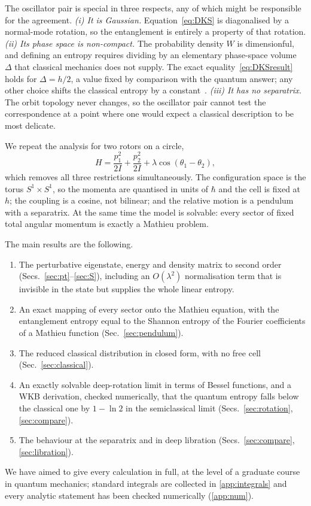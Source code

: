 \documentclass[preprint,12pt]{elsarticle}
\begin{document}
The oscillator pair is special in three respects, any of which might be
responsible for the agreement.
\emph{(i) It is Gaussian.} Equation~\eqref{eq:DKS} is diagonalised by a
normal-mode rotation, so the entanglement is entirely a property of that
rotation.
\emph{(ii) Its phase space is non-compact.} The probability density $W$ is
dimensionful, and defining an entropy requires dividing by an elementary
phase-space volume $\Delta$ that classical mechanics does not supply. The exact
equality~\eqref{eq:DKSresult} holds for $\Delta=h/2$, a value fixed by
comparison with the quantum answer; any other choice shifts the classical
entropy by a constant~\cite{DKS}.
\emph{(iii) It has no separatrix.} The orbit topology never changes, so the
oscillator pair cannot test the correspondence at a point where one would
expect a classical description to be most delicate.

We repeat the analysis for two rotors on a circle,
\begin{equation}
H=\frac{p_{1}^{2}}{2I}+\frac{p_{2}^{2}}{2I}
+\lambda\cos\left(\theta_{1}-\theta_{2}\right),
\label{eq:H}
\end{equation}
which removes all three restrictions simultaneously. The configuration space is
the torus $S^{1}\times S^{1}$, so the momenta are quantised in units of $\hbar$
and the cell is fixed at $h$; the coupling is a cosine, not bilinear; and the
relative motion is a pendulum with a separatrix. At the same time the model is
solvable: every sector of fixed total angular momentum is exactly a Mathieu
problem.

The main results are the following.
\begin{enumerate}
\item The perturbative eigenstate, energy and density matrix to second order
(Secs.~\ref{sec:pt}--\ref{sec:S}), including an $O(\lambda^{2})$ normalisation
term that is invisible in the state but supplies the whole linear entropy.
\item An exact mapping of every sector onto the Mathieu equation, with the
entanglement entropy equal to the Shannon entropy of the Fourier coefficients
of a Mathieu function (Sec.~\ref{sec:pendulum}).
\item The reduced classical distribution in closed form, with no free cell
(Sec.~\ref{sec:classical}).
\item An exactly solvable deep-rotation limit in terms of Bessel functions, and
a WKB derivation, checked numerically, that the quantum entropy falls below the
classical one by $1-\ln2$ in the semiclassical limit (Secs.~\ref{sec:rotation},
\ref{sec:compare}).
\item The behaviour at the separatrix and in deep libration
(Secs.~\ref{sec:compare}, \ref{sec:libration}).
\end{enumerate}
We have aimed to give every calculation in full, at the level of a graduate
course in quantum mechanics; standard integrals are collected in
\ref{app:integrals} and every analytic statement has been checked numerically
(\ref{app:num}).
\end{document}
